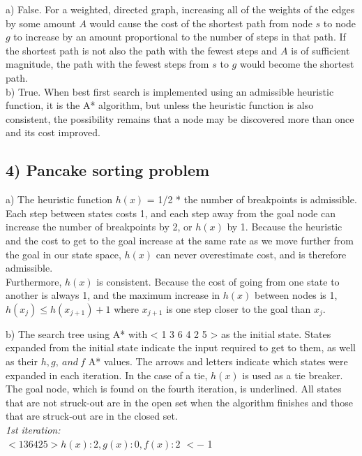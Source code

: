 \documentclass{article}
\begin{document}
a) False. For a weighted, directed graph, increasing all of the weights of the edges by some amount $A$ would cause the cost of the shortest path from node $s$ to node $g$ to increase by an amount proportional to the number of steps in that path. If the shortest path is not also the path with the fewest steps and $A$ is of sufficient magnitude, the path with the fewest steps from $s$ to $g$ would become the shortest path.\\

b) True. When best first search is implemented using an admissible heuristic function, it is the A* algorithm, but unless the heuristic function is also consistent, the possibility remains that a node may be discovered more than once and its cost improved.


\subsection*{4) Pancake sorting problem}

a) The heuristic function $h(x)$ = 1/2 * the number of breakpoints is admissible. Each step between states costs 1, and each step away from the goal node can increase the number of breakpoints by 2, or $h(x)$ by 1. Because the heuristic and the cost to get to the goal increase at the same rate as we move further from the goal in our state space, $h(x)$ can never overestimate cost, and is therefore admissible.\\

Furthermore, $h(x)$ is consistent. Because the cost of going from one state to another is always 1, and the maximum increase in $h(x)$ between nodes is 1, $h(x_{j}) \leq h(x_{j + 1}) + 1$ where $x_{j + 1}$ is one step closer to the goal than $x_{j}$.

b) The search tree using A* with < 1 3 6 4 2 5 > as the initial state. States expanded from the initial state indicate the input required to get to them, as well as their $h, g,\ and\ f$ A* values. The arrows and letters indicate which states were expanded in each iteration. In the case of a tie, $h(x)$ is used as a tie breaker. The goal node, which is found on the fourth iteration, is underlined. All states that are not struck-out are in the open set when the algorithm finishes and those that are struck-out are in the closed set.\\

\emph{1st iteration:}\\

\sout{$< 1 3 6 4 2 5 >  h(x): 2, g(x): 0, f(x): 2$} $<-$ 1 \\
\end{document}
